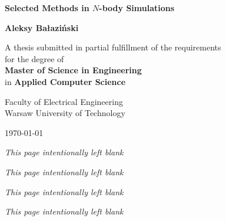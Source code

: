 \documentclass{report}
\newcommand{\blankpageifneeded}{
  \newpage
  \ifodd\value{page}
  \else
  \thispagestyle{empty}
    \vspace*{\fill}
    \begin{center}
        \textit{This page intentionally left blank}
    \end{center}
    \vspace{\fill}
    \newpage
    \addtocounter{page}{-1}
  \fi
}
\newcommand{\blankpage}{
  \newpage
  \thispagestyle{empty}
    \vspace*{\fill}
    \begin{center}
        \textit{This page intentionally left blank}
    \end{center}
    \vspace{\fill}
    \newpage
    \addtocounter{page}{-1}
}
\begin{document}
\newcommand{\PThreeM}{P$^3$M}
\begin{titlepage}
    \centering
    \vspace*{2cm}

    {\Huge\bfseries Selected Methods in $N$-body Simulations\par}
    \vspace{1.5cm}

    {\Large\bfseries Aleksy Bałaziński\par}
    \vspace{1.5cm}

    {\large
        A thesis submitted in partial fulfillment of the requirements\\
        for the degree of\\
        \textbf{Master of Science in Engineering}\\
        in \textbf{Applied Computer Science}\par
    }
    \vspace{0.5cm}

    {\large
        Faculty of Electrical Engineering\\
        Warsaw University of Technology
        \par}

    \vfill

    {\large \today\par}
    \thispagestyle{empty}
\end{titlepage}

\blankpage


\blankpage
{}


\blankpage
{}
\tableofcontents

\blankpageifneeded













\appendix

\end{document}
